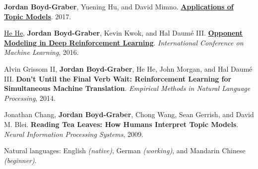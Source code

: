 \documentclass[10pt,a4paper]{article} %
\begin{document}
\begin{multicols}{2}
\begin{enumerate*}
\item {\bf Jordan Boyd-Graber}, Yuening Hu, and David Mimno.  {\bf \href{http://www.nowpublishers.com/article/Details/INR-030}{Applications of Topic Models}}.  2017.

	 \item \underline{\href{http://www.umiacs.umd.edu/~hhe/}{He He}}, {\bf Jordan Boyd-Graber}, Kevin Kwok, and Hal {Daum\'{e} III}.  {\bf \href{http://umiacs.umd.edu/~jbg//docs/2016_icml_opponent.pdf}{Opponent Modeling in Deep Reinforcement Learning}}.  \emph{International Conference on Machine Learning}, 2016.

\item Alvin {Grissom II}, {\bf Jordan Boyd-Graber}, He He, John Morgan, and Hal {Daum\'{e} III}.  {\bf Don't Until the Final Verb Wait: Reinforcement Learning for Simultaneous Machine Translation}.  \emph{Empirical Methods in Natural Language Processing}, 2014.


\item Jonathan Chang, {\bf Jordan Boyd-Graber}, Chong Wang, Sean Gerrish,
and David M. Blei.  {\bf Reading Tea Leaves: How Humans Interpret
  Topic Models}.  \emph{Neural Information Processing Systems}, 2009.



\end{enumerate*}

\end{multicols}

\spacedhrule{1.6em}{-0.4em} %


\inlineheadsection %
{Natural languages:}
{English \textit{(native)}, German \textit{(working)}, and Mandarin Chinese \textit{(beginner)}.}

\end{document}
